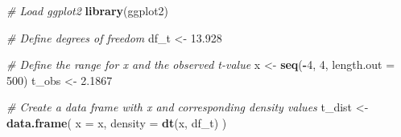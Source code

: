 \documentclass[
]{book}
\newenvironment{Shaded}{\begin{snugshade}}{\end{snugshade}}
\newcommand{\AttributeTok}[1]{\textcolor[rgb]{0.13,0.29,0.53}{#1}}
\newcommand{\CommentTok}[1]{\textcolor[rgb]{0.56,0.35,0.01}{\textit{#1}}}
\newcommand{\DecValTok}[1]{\textcolor[rgb]{0.00,0.00,0.81}{#1}}
\newcommand{\FloatTok}[1]{\textcolor[rgb]{0.00,0.00,0.81}{#1}}
\newcommand{\FunctionTok}[1]{\textcolor[rgb]{0.13,0.29,0.53}{\textbf{#1}}}
\newcommand{\NormalTok}[1]{#1}
\newcommand{\OtherTok}[1]{\textcolor[rgb]{0.56,0.35,0.01}{#1}}
\newcommand{\SpecialCharTok}[1]{\textcolor[rgb]{0.81,0.36,0.00}{\textbf{#1}}}
\begin{document}
\begin{Shaded}
\begin{Highlighting}[]
\CommentTok{\# Load ggplot2}
\FunctionTok{library}\NormalTok{(ggplot2)}

\CommentTok{\# Define degrees of freedom}
\NormalTok{df\_t }\OtherTok{\textless{}{-}} \FloatTok{13.928}

\CommentTok{\# Define the range for x and the observed t{-}value}
\NormalTok{x }\OtherTok{\textless{}{-}} \FunctionTok{seq}\NormalTok{(}\SpecialCharTok{{-}}\DecValTok{4}\NormalTok{, }\DecValTok{4}\NormalTok{, }\AttributeTok{length.out =} \DecValTok{500}\NormalTok{)}
\NormalTok{t\_obs }\OtherTok{\textless{}{-}} \FloatTok{2.1867}

\CommentTok{\# Create a data frame with x and corresponding density values}
\NormalTok{t\_dist }\OtherTok{\textless{}{-}} \FunctionTok{data.frame}\NormalTok{(}
  \AttributeTok{x =}\NormalTok{ x,}
  \AttributeTok{density =} \FunctionTok{dt}\NormalTok{(x, df\_t)}
\NormalTok{)}


\end{Highlighting}
\end{Shaded}
\end{document}
